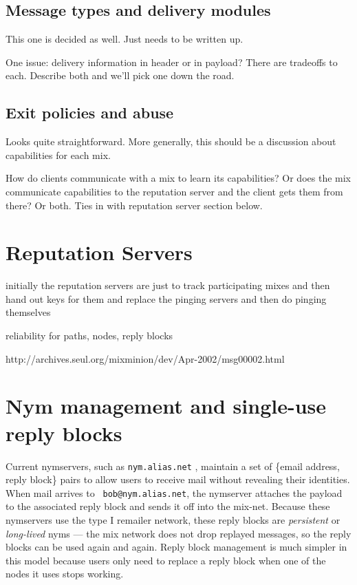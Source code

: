 \documentclass{llncs}
\begin{document}
\subsection{Message types and delivery modules}

This one is decided as well. Just needs to be written up.

One issue: delivery information in header or in payload?
There are tradeoffs to each. Describe both and we'll pick one down the road.

\subsection{Exit policies and abuse}

Looks quite straightforward. More generally, this should be a discussion
about capabilities for each mix.

How do clients communicate with a mix to learn its capabilities? Or does
the mix communicate capabilities to the reputation server and the client
gets them from there? Or both. Ties in with reputation server section
below.


\section{Reputation Servers}
\label{sec:rep-servers}

initially the reputation servers are just to track participating
mixes
and then hand out keys for them
and replace the pinging servers
and then do pinging themselves

reliability for paths, nodes, reply blocks

http://archives.seul.org/mixminion/dev/Apr-2002/msg00002.html


\section{Nym management and single-use reply blocks}
\label{sec:nymservers}

Current nymservers, such as {\tt nym.alias.net} \cite{nym-alias-net},
maintain a set of \{email address, reply block\} pairs to allow users to
receive mail without revealing their identities. When mail arrives to {\tt
bob@nym.alias.net}, the nymserver attaches the payload to the associated
reply block and sends it off into the mix-net. Because these nymservers
use the type I remailer network, these reply blocks are \emph{persistent}
or \emph{long-lived} nyms --- the mix network does not drop replayed
messages, so the reply blocks can be used again and again. Reply block
management is much simpler in this model because users only need to
replace a reply block when one of the nodes it uses stops working.
\end{document}
